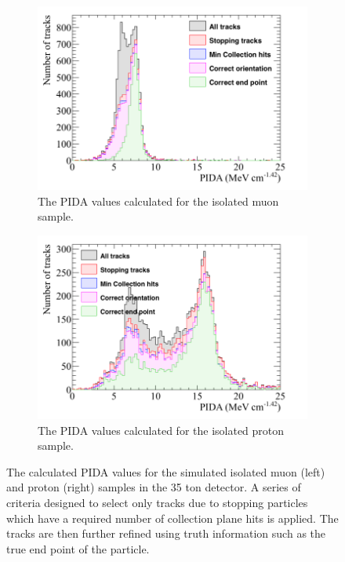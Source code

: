 \begin{figure}
  \centering
  \begin{subfigure}{0.48\textwidth}
        \centering
        \includegraphics[width=\textwidth]{IsolatedMuons_500V_Dec16_Muon_PIDA}
        \caption{The PIDA values calculated for the isolated muon sample.}
        \label{fig:Isol_PIDA_Proton}
  \end{subfigure}%
  \hspace{0.03\textwidth}%
  \begin{subfigure}{0.48\textwidth}
        \centering
        \includegraphics[width=\textwidth]{IsolatedProtons_500V_Dec16_Proton_PIDA}
        \caption{The PIDA values calculated for the isolated proton sample.}
        \label{fig:Isol_PIDA_Muon}
  \end{subfigure}
  \caption[The calculated PIDA values for the simulated isolated muon and proton samples in the 35 ton detector.]
          {The calculated PIDA values for the simulated isolated muon (left) and proton (right) samples in the 35 ton detector. A series of criteria designed to select only tracks due to stopping particles which have a required number of collection plane hits is applied. The tracks are then further refined using truth information such as the true end point of the particle.}
  \label{fig:Isol_PIDA}
\end{figure}

